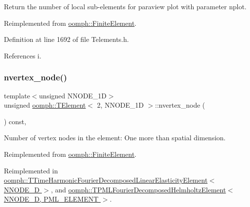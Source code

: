 Return the number of local sub-\/elements for paraview plot with parameter nplot. 



Reimplemented from \hyperlink{classoomph_1_1FiniteElement_aa1e11deffc8ee67adaa59ce3ade0579f}{oomph\+::\+Finite\+Element}.



Definition at line 1692 of file Telements.\+h.



References i.

\mbox{\label{classoomph_1_1TElement_3_012_00_01NNODE__1D_01_4_a0b3bdb736afb3d9d08708f6a34ccf0b3}} 
\subsubsection{\texorpdfstring{nvertex\+\_\+node()}{nvertex\_node()}}
{\footnotesize\ttfamily template$<$unsigned N\+N\+O\+D\+E\+\_\+1D$>$ \\
unsigned \hyperlink{classoomph_1_1TElement}{oomph\+::\+T\+Element}$<$ 2, N\+N\+O\+D\+E\+\_\+1D $>$\+::nvertex\+\_\+node (\begin{DoxyParamCaption}{ }\end{DoxyParamCaption}) const\hspace{0.3cm}{\ttfamily [inline]}, {\ttfamily [virtual]}}



Number of vertex nodes in the element\+: One more than spatial dimension. 



Reimplemented from \hyperlink{classoomph_1_1FiniteElement_a45631a7aa50efc3123a921d114f84cba}{oomph\+::\+Finite\+Element}.



Reimplemented in \hyperlink{classoomph_1_1TTimeHarmonicFourierDecomposedLinearElasticityElement_a57870ab2c9c506070441d8a428820d27}{oomph\+::\+T\+Time\+Harmonic\+Fourier\+Decomposed\+Linear\+Elasticity\+Element$<$ N\+N\+O\+D\+E\+\_\+D $>$}, and \hyperlink{classoomph_1_1TPMLFourierDecomposedHelmholtzElement_a1fe9d66fb864483105f2d2cbabd072a0}{oomph\+::\+T\+P\+M\+L\+Fourier\+Decomposed\+Helmholtz\+Element$<$ N\+N\+O\+D\+E\+\_\+D, P\+M\+L\+\_\+\+E\+L\+E\+M\+E\+N\+T $>$}.




